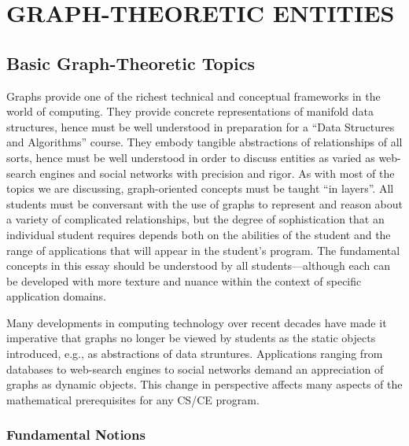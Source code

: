 
\chapter{GRAPH-THEORETIC ENTITIES}

\section{Basic Graph-Theoretic Topics}

Graphs provide one of the richest technical and conceptual frameworks
in the world of computing.  They provide concrete representations of
manifold data structures, hence must be well understood in preparation
for a ``Data Structures and Algorithms'' course.  They embody tangible
abstractions of relationships of all sorts, hence must be well
understood in order to discuss entities as varied as web-search
engines and social networks with precision and rigor.  As with most of
the topics we are discussing, graph-oriented concepts must be taught
``in layers''.  All students must be conversant with the use of graphs
to represent and reason about a variety of complicated relationships,
but the degree of sophistication that an individual student requires
depends both on the abilities of the student and the range of
applications that will appear in the student's program.  The
fundamental concepts in this essay should be understood by all
students---although each can be developed with more texture and nuance
within the context of specific application domains.

Many developments in computing technology over recent decades have
made it imperative that graphs no longer be viewed by students as the
static objects introduced, e.g., as abstractions of data struntures.
Applications ranging from databases to web-search engines to social
networks demand an appreciation of graphs as dynamic objects.  This
change in perspective affects many aspects of the mathematical
prerequisites for any CS/CE program.

\subsection{Fundamental Notions}

